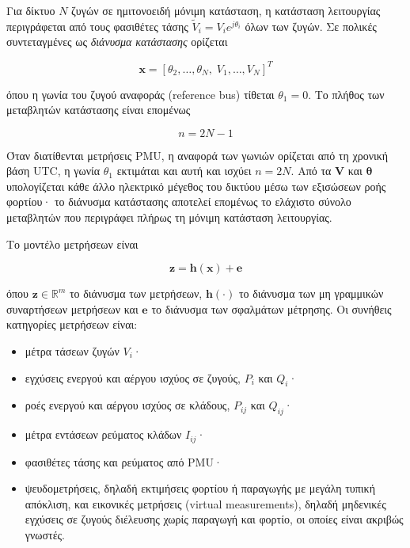 Για δίκτυο $N$ ζυγών σε ημιτονοειδή μόνιμη κατάσταση, η κατάσταση λειτουργίας περιγράφεται από
τους φασιθέτες τάσης $\tilde{V}_i = V_i e^{j\theta_i}$ όλων των ζυγών. Σε πολικές συντεταγμένες
ως \emph{διάνυσμα κατάστασης} ορίζεται

\begin{equation}
\mathbf{x} = \left[\theta_2, \ldots, \theta_N,\; V_1, \ldots, V_N\right]^{T}
\label{eq:statevec}
\end{equation}

όπου η γωνία του ζυγού αναφοράς (reference bus) τίθεται $\theta_1 = 0$. Το πλήθος των
μεταβλητών κατάστασης είναι επομένως

\begin{equation}
n = 2N - 1
\label{eq:nstates}
\end{equation}

Όταν διατίθενται μετρήσεις PMU, η αναφορά των γωνιών ορίζεται από τη χρονική βάση UTC, η
γωνία $\theta_1$ εκτιμάται και αυτή και ισχύει $n = 2N$. Από τα $\mathbf{V}$ και
$\boldsymbol{\theta}$ υπολογίζεται κάθε άλλο ηλεκτρικό μέγεθος του δικτύου μέσω των εξισώσεων
ροής φορτίου· το διάνυσμα κατάστασης αποτελεί επομένως το ελάχιστο σύνολο μεταβλητών που
περιγράφει πλήρως τη μόνιμη κατάσταση λειτουργίας.

Το μοντέλο μετρήσεων είναι

\begin{equation}
\mathbf{z} = \mathbf{h}(\mathbf{x}) + \mathbf{e}
\label{eq:measmodel}
\end{equation}

όπου $\mathbf{z} \in \mathbb{R}^{m}$ το διάνυσμα των μετρήσεων, $\mathbf{h}(\cdot)$ το
διάνυσμα των μη γραμμικών συναρτήσεων μετρήσεων και $\mathbf{e}$ το διάνυσμα των σφαλμάτων
μέτρησης. Οι συνήθεις κατηγορίες μετρήσεων είναι:

\begin{itemize}
\item μέτρα τάσεων ζυγών $V_i$·
\item εγχύσεις ενεργού και αέργου ισχύος σε ζυγούς, $P_i$ και $Q_i$·
\item ροές ενεργού και αέργου ισχύος σε κλάδους, $P_{ij}$ και $Q_{ij}$·
\item μέτρα εντάσεων ρεύματος κλάδων $I_{ij}$·
\item φασιθέτες τάσης και ρεύματος από PMU·
\item ψευδομετρήσεις, δηλαδή εκτιμήσεις φορτίου ή παραγωγής με μεγάλη τυπική απόκλιση, και
      εικονικές μετρήσεις (virtual measurements), δηλαδή μηδενικές εγχύσεις σε ζυγούς
      διέλευσης χωρίς παραγωγή και φορτίο, οι οποίες είναι ακριβώς γνωστές.
\end{itemize}

